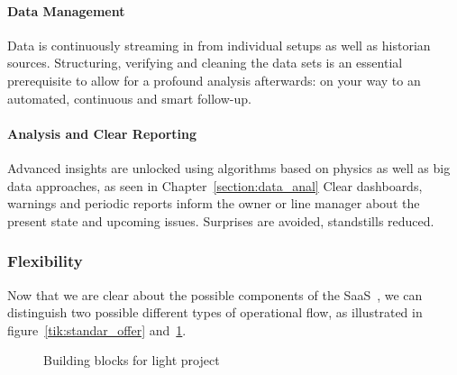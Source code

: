 \paragraph{Data Management}
Data is continuously streaming in from individual setups as well as historian sources.
Structuring, verifying and cleaning the data sets is an essential prerequisite to allow for a profound analysis afterwards: on your way to an automated, continuous and smart follow-up.

\paragraph{Analysis and Clear Reporting}
Advanced insights are unlocked using algorithms based on physics as well as big data approaches, as seen in Chapter~\ref{section:data_anal}
Clear dashboards, warnings and periodic reports inform the owner or line manager about the present state and upcoming issues. Surprises are avoided, standstills reduced.

\subsubsection{Flexibility}
Now that we are clear about the possible components of the \ac{SaaS}~\cite{Article:matthewlemerle_2012_its}, we can distinguish two possible different types of operational flow, as illustrated in figure~\ref{tik:standar_offer} and~\ref{tik:ligth_offer}.
\begin{figure}[ht]
	\centering
	\caption{Building blocks for light project}
	\label{tik:ligth_offer}
\end{figure}

